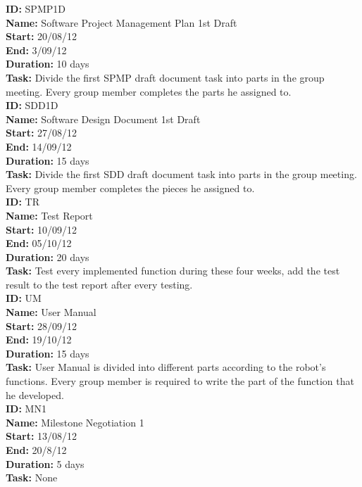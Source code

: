 \documentclass[11pt, a4paper]{report}
\begin{document}
\noindent \textbf{ID:} SPMP1D \\
\noindent \textbf{Name:} Software Project Management Plan 1st Draft\\
\noindent \textbf{Start:} 20/08/12 \\
\noindent \textbf{End:} 3/09/12 \\
\noindent \textbf{Duration:} 10 days \\
\noindent \textbf{Task:} Divide the first SPMP draft document task into parts in the group meeting. Every group member completes the parts he assigned to.\\[0.5cm]

\noindent \textbf{ID:} SDD1D \\
\noindent \textbf{Name:} Software Design Document 1st Draft\\
\noindent \textbf{Start:} 27/08/12 \\
\noindent \textbf{End:} 14/09/12 \\
\noindent \textbf{Duration:} 15 days \\
\noindent \textbf{Task:} Divide the first SDD draft document task into parts in the group meeting. Every group member completes the pieces he assigned to.\\[0.5cm]

\noindent \textbf{ID:} TR \\
\noindent \textbf{Name:} Test Report\\
\noindent \textbf{Start:} 10/09/12 \\
\noindent \textbf{End:} 05/10/12 \\
\noindent \textbf{Duration:} 20 days \\
\noindent \textbf{Task:} Test every implemented function during these four weeks, add the test result to the test report after every testing.\\[0.5cm]

\noindent \textbf{ID:} UM \\
\noindent \textbf{Name:} User Manual \\
\noindent \textbf{Start:} 28/09/12 \\
\noindent \textbf{End:} 19/10/12 \\
\noindent \textbf{Duration:} 15 days \\
\noindent \textbf{Task:} User Manual is divided into different parts according to the robot's functions. Every group member is required to write the part of the function that he developed.\\[0.5cm]

\noindent \textbf{ID:} MN1 \\
\noindent \textbf{Name:} Milestone Negotiation 1 \\
\noindent \textbf{Start:} 13/08/12 \\
\noindent \textbf{End:} 20/8/12 \\
\noindent \textbf{Duration:} 5 days \\
\noindent \textbf{Task:} None\\[0.5cm]
\end{document}

